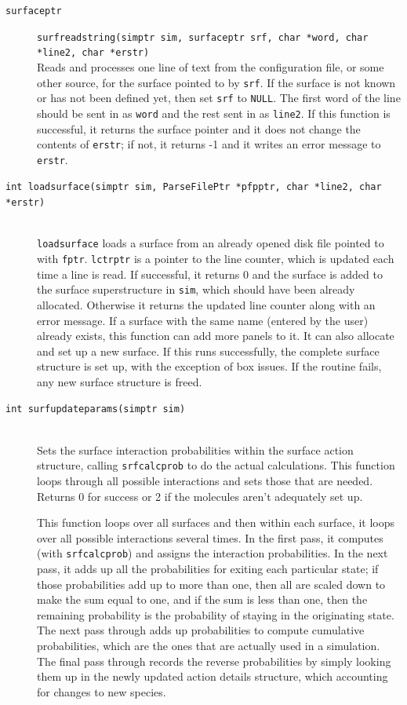 \documentclass {scrbook}
\newcommand {\ttt} {\texttt}
\begin{document}
\begin{description}
\item[\ttt{surfaceptr}]
\ttt{surfreadstring(simptr sim, surfaceptr srf, char *word, char *line2, char *erstr)}
\hfill \\
Reads and processes one line of text from the configuration file, or some other source, for the surface pointed to by \ttt{srf}. If the surface is not known or has not been defined yet, then set \ttt{srf} to \ttt{NULL}. The first word of the line should be sent in as \ttt{word} and the rest sent in as \ttt{line2}. If this function is successful, it returns the surface pointer and it does not change the contents of \ttt{erstr}; if not, it returns -1 and it writes an error message to \ttt{erstr}.

\item[\ttt{int loadsurface(simptr sim, ParseFilePtr *pfpptr, char *line2, char *erstr)}]
\hfill \\
\ttt{loadsurface} loads a surface from an already opened disk file pointed to with \ttt{fptr}. \ttt{lctrptr} is a pointer to the line counter, which is updated each time a line is read. If successful, it returns 0 and the surface is added to the surface superstructure in \ttt{sim}, which should have been already allocated. Otherwise it returns the updated line counter along with an error message. If a surface with the same name (entered by the user) already exists, this function can add more panels to it. It can also allocate and set up a new surface. If this runs successfully, the complete surface structure is set up, with the exception of box issues. If the routine fails, any new surface structure is freed.

\item[\ttt{int surfupdateparams(simptr sim)}]
\hfill \\
Sets the surface interaction probabilities within the surface action structure, calling \ttt{srfcalcprob} to do the actual calculations. This function loops through all possible interactions and sets those that are needed. Returns 0 for success or 2 if the molecules aren't adequately set up.

This function loops over all surfaces and then within each surface, it loops over all possible interactions several times. In the first pass, it computes (with \ttt{srfcalcprob}) and assigns the interaction probabilities. In the next pass, it adds up all the probabilities for exiting each particular state; if those probabilities add up to more than one, then all are scaled down to make the sum equal to one, and if the sum is less than one, then the remaining probability is the probability of staying in the originating state. The next pass through adds up probabilities to compute cumulative probabilities, which are the ones that are actually used in a simulation. The final pass through records the reverse probabilities by simply looking them up in the newly updated action details structure, which accounting for changes to new species.


\end{description}
\end{document}
